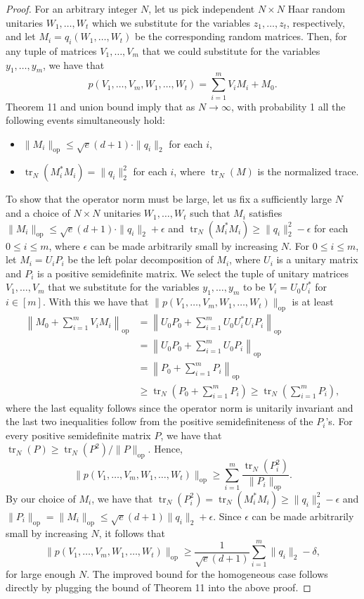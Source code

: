 \begin{proof}
For an arbitrary integer $N$, let us pick independent $N\times N$ Haar random unitaries $W_1,\ldots,W_t$ which we substitute for the variables $z_1,\ldots,z_t$, respectively, and let $M_i=q_i(W_1,\ldots,W_t)$ be the corresponding random matrices. Then, for any tuple of matrices $V_1,\ldots,V_m$ that we could substitute for the variables $y_1,\ldots,y_m$, we have that
\[p(V_1,\ldots,V_m,W_1,\ldots,W_t)=\sum_{i=1}^mV_iM_i+M_0.\]
Theorem 11 and union bound imply that as $N\to\infty$, with probability 1 all the following events simultaneously hold:
\begin{itemize}
\item $\|M_i\|_{\mathrm{op}}\leq\sqrt e(d+1)\cdot\|q_i\|_2$ for each $i$,
\item $\operatorname{tr}_N(M_i^*M_i)=\|q_i\|_2^2$ for each $i$, where $\operatorname{tr}_N(M)$ is the normalized trace.
\end{itemize}
To show that the operator norm must be large, let us fix a sufficiently large $N$ and a choice of $N\times N$ unitaries $W_1,\ldots,W_t$ such that $M_i$ satisfies $\|M_i\|_{\mathrm{op}}\leq\sqrt e(d+1)\cdot\|q_i\|_2+\epsilon$ and $\operatorname{tr}_N(M_i^*M_i)\geq\|q_i\|_2^2-\epsilon$ for each $0\leq i\leq m$, where $\epsilon$ can be made arbitrarily small by increasing $N$. For $0\leq i\leq m$, let $M_i=U_iP_i$ be the left polar decomposition of $M_i$, where $U_i$ is a unitary matrix and $P_i$ is a positive semidefinite matrix.
We select the tuple of unitary matrices $V_1,\ldots,V_m$ that we substitute for the variables $y_1,\ldots,y_m$ to be $V_i=U_0U_i^*$ for $i\in[m]$. With this we have that $\|p(V_1,\ldots,V_m,W_1,\ldots,W_t)\|_{\mathrm{op}}$ is at least
\begin{align*}
\left\|M_0+\sum_{i=1}^mV_iM_i\right\|_{\mathrm{op}}
&=\left\|U_0P_0+\sum_{i=1}^mU_0U_i^*U_iP_i\right\|_{\mathrm{op}}\\
&=\left\|U_0P_0+\sum_{i=1}^mU_0P_i\right\|_{\mathrm{op}}\\
&=\left\|P_0+\sum_{i=1}^mP_i\right\|_{\mathrm{op}}\\
&\geq\operatorname{tr}_N\left(P_0+\sum_{i=1}^mP_i\right)\geq\operatorname{tr}_N\left(\sum_{i=1}^mP_i\right),
\end{align*}
where the last equality follows since the operator norm is unitarily invariant and the last two inequalities follow from the positive semidefiniteness of the $P_i$'s.
For every positive semidefinite matrix $P$, we have that $\operatorname{tr}_N(P)\geq\operatorname{tr}_N(P^2)/\|P\|_{\mathrm{op}}$. Hence,
\[\|p(V_1,\ldots,V_m,W_1,\ldots,W_t)\|_{\mathrm{op}}\geq\sum_{i=1}^m\frac{\operatorname{tr}_N(P_i^2)}{\|P_i\|_{\mathrm{op}}}.\]
By our choice of $M_i$, we have that $\operatorname{tr}_N(P_i^2)=\operatorname{tr}_N(M_i^*M_i)\geq\|q_i\|_2^2-\epsilon$ and $\|P_i\|_{\mathrm{op}}=\|M_i\|_{\mathrm{op}}\leq\sqrt e(d+1)\|q_i\|_2+\epsilon$. Since $\epsilon$ can be made arbitrarily small by increasing $N$, it follows that
\[\|p(V_1,\ldots,V_m,W_1,\ldots,W_t)\|_{\mathrm{op}}\geq\frac1{\sqrt e(d+1)}\sum_{i=1}^m\|q_i\|_2-\delta,\]
for large enough $N$. The improved bound for the homogeneous case follows directly by plugging the bound of Theorem 11 into the above proof.
\end{proof}
